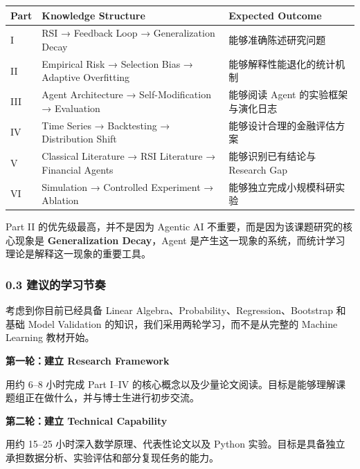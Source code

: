 \begin{readertable}
\begin{longtable}[]{@{}
  >{\raggedright\arraybackslash}p{}
  >{\raggedright\arraybackslash}p{}
  >{\raggedright\arraybackslash}p{}@{}}
\toprule
Part & Knowledge Structure & Expected Outcome \\
\midrule
\endhead
I & RSI → Feedback Loop → Generalization Decay & 能够准确陈述研究问题 \\
II & Empirical Risk → Selection Bias → Adaptive Overfitting & 能够解释性能退化的统计机制 \\
III & Agent Architecture → Self-Modification → Evaluation & 能够阅读 Agent 的实验框架与演化日志 \\
IV & Time Series → Backtesting → Distribution Shift & 能够设计合理的金融评估方案 \\
V & Classical Literature → RSI Literature → Financial Agents & 能够识别已有结论与 Research Gap \\
VI & Simulation → Controlled Experiment → Ablation & 能够独立完成小规模科研实验 \\
\bottomrule
\end{longtable}
\end{readertable}

Part II 的优先级最高，并不是因为 Agentic AI 不重要，而是因为该课题研究的核心现象是 \textbf{Generalization Decay}，Agent 是产生这一现象的系统，而统计学习理论是解释这一现象的重要工具。

\hypertarget{part-1-07-0001-ux5efaux8baeux7684ux5b66ux4e60ux8282ux594f}{%
\subsubsection{0.3 建议的学习节奏}\label{part-1-07-0001-ux5efaux8baeux7684ux5b66ux4e60ux8282ux594f}}

考虑到你目前已经具备 Linear Algebra、Probability、Regression、Bootstrap 和基础 Model Validation 的知识，我们采用两轮学习，而不是从完整的 Machine Learning 教材开始。

\textbf{第一轮：建立 Research Framework}

用约 6--8 小时完成 Part I--IV 的核心概念以及少量论文阅读。目标是能够理解课题组正在做什么，并与博士生进行初步交流。

\textbf{第二轮：建立 Technical Capability}

用约 15--25 小时深入数学原理、代表性论文以及 Python 实验。目标是具备独立承担数据分析、实验评估和部分复现任务的能力。

